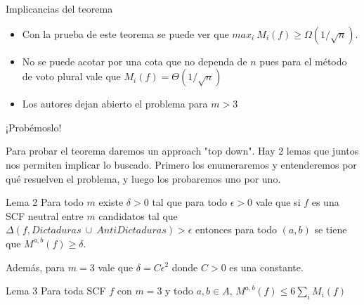 \documentclass[compress]{beamer}
\begin{document}
\begin{frame}{Implicancias del teorema}
\begin{itemize}
\item Con la prueba de este teorema se puede ver que $max_i \ M_i(f) \geq 
\Omega(1/ \sqrt n)$.

\item No se puede acotar por una cota que no dependa de
$n$ pues para el método de voto plural vale que 
$M_i(f) = \Theta(1/\sqrt n)$

\item Los autores dejan abierto el problema para $m > 3$
\end{itemize}
\end{frame}

\begin{frame}
\end{frame}


\begin{frame}{¡Probémoslo!}

Para probar el teorema daremos un approach "top down". Hay 2 lemas que
juntos nos permiten implicar lo buscado. Primero los enumeraremos y 
entenderemos por qué resuelven el problema, y luego los probaremos uno
por uno.

\end{frame}


\begin{frame}
\begin{block}{Lema 2}
Para todo $m$ existe $\delta > 0$ tal que para todo $\epsilon > 0$ 
vale que si $f$ es una SCF neutral entre $m$ candidatos tal que 
$\Delta(f, Dictaduras \ \cup \ AntiDictaduras) > \epsilon$
entonces para todo $(a, b)$ se tiene que $M^{a,b}(f) \geq \delta$.\\
\bigskip

Además, para $m = 3$ vale que $\delta = C\epsilon^2$ donde $C>0$ es una
constante.
\end{block}
\bigskip

\begin{block}{Lema 3}
Para toda SCF $f$ con $m = 3$ y todo $a, b \in A$, 
$M^{a,b}(f) \leq 6 \sum_i M_i(f)$
\end{block}
\end{frame}
\end{document}
